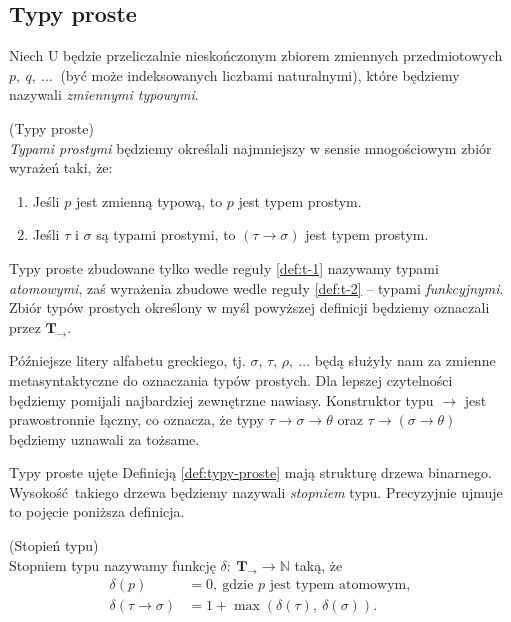 \subsection{Typy proste}\label{ssec:typy-proste}
Niech \(\mathrm{U}\) będzie przeliczalnie nieskończonym zbiorem zmiennych przedmiotowych \(p,\ q,\ \dots\ \) (być może indeksowanych liczbami naturalnymi), które będziemy nazywali \emph{zmiennymi typowymi}.\begin{definicja}\label{def:typy-proste}(Typy proste)\\
\emph{Typami prostymi} będziemy określali najmniejszy w sensie mnogościowym zbiór wyrażeń taki, że:
\begin{enumerate}[label=T\arabic*.]
  \item Jeśli \(p\) jest zmienną typową, to \(p\) jest typem prostym.\label{def:t-1}
  \item Jeśli \(\tau\) i \(\sigma\) są typami prostymi, to \(\left(\tau\to\sigma\right)\) jest typem prostym.\label{def:t-2}
\end{enumerate}
\end{definicja}

Typy proste zbudowane tylko wedle reguły \ref{def:t-1} nazywamy typami \emph{atomowymi}, zaś wyrażenia zbudowe wedle reguły \ref{def:t-2} -- typami \emph{funkcyjnymi}. Zbiór typów prostych określony w myśl powyższej definicji będziemy oznaczali przez \(\mathbf{T_\to}\).

Późniejsze litery alfabetu greckiego, tj. \(\sigma,\, \tau,\, \rho,\ \dots\) będą służyły nam za zmienne metasyntaktyczne do oznaczania typów prostych. Dla lepszej czytelności będziemy pomijali najbardziej zewnętrzne nawiasy. Konstruktor typu \(\to\) jest prawostronnie łączny, co oznacza, że typy \(\tau\to\sigma\to\theta\) oraz \(\tau\to(\sigma\to\theta)\) będziemy uznawali za tożsame.

Typy proste ujęte Definicją \ref{def:typy-proste} mają strukturę drzewa binarnego. Wysokość takiego drzewa będziemy nazywali \emph{stopniem} typu. Precyzyjnie ujmuje to pojęcie poniższa definicja.
\begin{definicja}\label{def:stopien-typu}(Stopień typu)\\
  Stopniem typu nazywamy funkcję \(\delta :\: \mathbf{T}_\to \longrightarrow \mathbb{N}\) taką, że
  \begin{align*}
    \delta(p) &= 0,\ \text{gdzie \(p\) jest typem atomowym},\\
    \delta(\tau\to\sigma)&=1 + \max\left(\delta(\tau),\ \delta(\sigma)\right).
  \end{align*}
\end{definicja}


